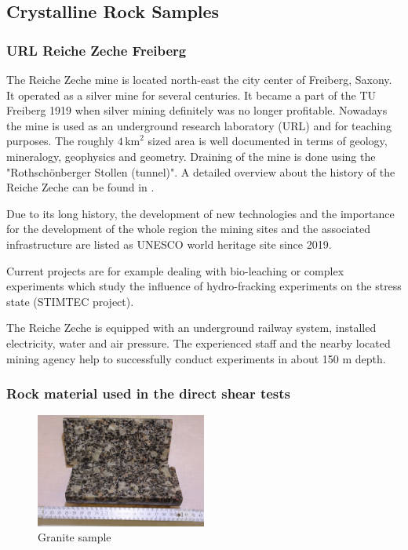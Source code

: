 \subsection{Crystalline Rock Samples}

\subsubsection{URL Reiche Zeche Freiberg}
The Reiche Zeche mine is located north-east the city center of Freiberg, Saxony. It operated as a silver mine for several centuries. It became a part of the TU Freiberg 1919 when silver mining definitely was no longer profitable. Nowadays the mine is used as an underground research laboratory (URL) and for teaching purposes. The roughly $4\,\text{km}^2$ sized area is well documented in terms of geology, mineralogy, geophysics and geometry. Draining of the mine is done using the "Rothsch\"onberger Stollen (tunnel)". A detailed overview about the history of the Reiche Zeche can be found in \cite{ReicheZecheHistory}.

Due to its long history, the development of new technologies and the importance for the development of the whole region the mining sites and the associated infrastructure are listed as UNESCO world heritage site since 2019.

Current projects are for example dealing with bio-leaching or complex experiments which study the influence of hydro-fracking experiments on the stress state (STIMTEC project).

The Reiche Zeche is equipped with an underground railway system, installed electricity, water and air pressure. The experienced staff and the nearby located mining agency help to successfully conduct experiments in about 150 m depth. 


\subsubsection{Rock material used in the direct shear tests}
\begin{figure}[!ht]
\begin{center}
\includegraphics[width=0.5\textwidth]{./figures/ExpRockGranite.JPG}
\end{center}
\caption{Granite sample}
\label{fig:RockGranite}
\end{figure}

